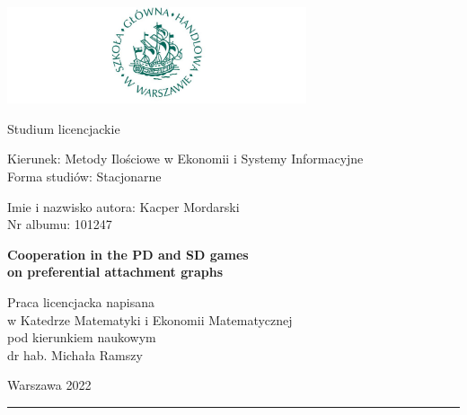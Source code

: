 \documentclass[english, twoside, 12pt, a4paper]{article}
\theoremstyle{definition}
\theoremstyle{plain}
\theoremstyle{remark}
\begin{document}
\begin{titlepage}
\centering

\includegraphics[width=0.66\textwidth]{logo.JPG}

\vspace*{0.5cm}
Studium licencjackie\\
\begin{flushleft}
Kierunek: Metody Ilościowe w Ekonomii i Systemy Informacyjne\\
Forma studiów: Stacjonarne
\end{flushleft}

\vspace*{.5cm}
\rule{0cm}{1cm}\hfill
\begin{minipage}{9cm}
Imie i nazwisko autora: Kacper Mordarski\\
Nr albumu: 101247
\end{minipage}

\vspace*{1cm}
\begin{minipage}{12cm}
\centering
\Large
\textbf{Cooperation in the PD and SD games\\on preferential attachment graphs}
\end{minipage}

\vspace*{2cm}
\rule{0cm}{1cm}\hfill
\begin{minipage}{9cm}
Praca licencjacka napisana\\
w Katedrze Matematyki i Ekonomii Matematycznej\\
pod kierunkiem naukowym\\
dr hab. Michała Ramszy
\end{minipage}

\vfill
Warszawa 2022
\end{titlepage}

\rule{1ex}{0ex}\clearpage

\cleardoublepage
\tableofcontents

\cleardoublepage
\end{document}
